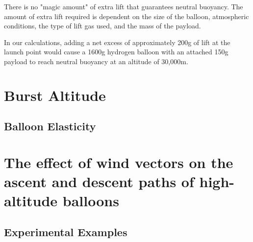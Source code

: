 \documentclass[usaAMS,usenatbib]{mn2e}
\begin{document}
There is no "magic amount" of extra lift that guarantees neutral buoyancy. The amount of extra lift required is dependent on the size of the balloon, atmospheric conditions, the type of lift gas used, and the mass of the payload.

In our calculations, adding a net excess of approximately 200g of lift at the launch point would cause a 1600g hydrogen balloon with an attached 150g payload to reach neutral buoyancy at an altitude of 30,000m.

\section{Burst Altitude}

\subsection{Balloon Elasticity}

\section{The effect of wind vectors on the ascent and descent paths of high-altitude balloons}

\subsection{Experimental Examples}

\label{lastpage}


\end{document}
